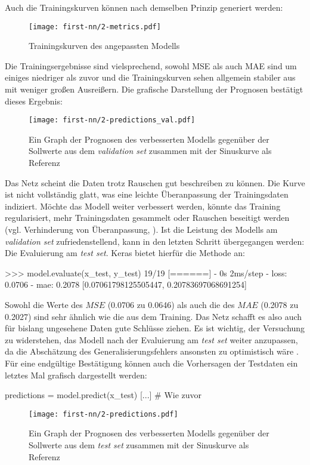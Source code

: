Auch die Trainingskurven können nach demselben Prinzip
generiert werden:
\begin{figure}[h!]
  \centering
  \texttt{[image: first-nn/2-metrics.pdf]}
  \caption{Trainingskurven des angepassten Modells}
\end{figure}

\noindent
Die Trainingsergebnisse sind vielsprechend, sowohl MSE als auch MAE
sind um einiges niedriger als zuvor und die Trainingskurven
sehen allgemein stabiler aus mit weniger großen Ausreißern.
Die grafische Darstellung der Prognosen bestätigt dieses Ergebnis:
\begin{figure}[h!]
  \centering
  \texttt{[image: first-nn/2-predictions\_val.pdf]}
  \caption{Ein Graph der Prognosen des verbesserten Modells gegenüber der Sollwerte aus dem
  \textit{validation set} zusammen mit der Sinuskurve als Referenz}
\end{figure}

\noindent
Das Netz scheint die Daten trotz Rauschen gut beschreiben zu können.
Die Kurve ist nicht vollständig glatt, was eine leichte Überanpassung der Trainingsdaten
indiziert. Möchte das Modell weiter verbessert werden,
könnte das Training regularisiert,
mehr Trainingsdaten gesammelt oder Rauschen beseitigt werden
(vgl. Verhinderung von Überanpassung, \cite[28]{book:hands-on-ml}).
Ist die Leistung des Modells am \textit{validation set} zufriedenstellend,
kann in den letzten Schritt übergegangen werden: Die Evaluierung am \textit{test set}.
Keras bietet hierfür die Methode  an:
\begin{pyconcode}
>>> model.evaluate(x_test, y_test)
19/19 [======] - 0s 2ms/step - loss: 0.0706 - mae: 0.2078
[0.07061798125505447, 0.20783697068691254]
\end{pyconcode}
Sowohl die Werte des $MSE$ (\num{0.0706} zu \num{0.0646}) als auch
die des $MAE$ (\num{0.2078} zu \num{0.2027}) sind sehr ähnlich
wie die aus dem Training. Das Netz schafft es also auch für
bislang ungesehene Daten gute Schlüsse ziehen.
Es ist wichtig, der Versuchung zu widerstehen, das Modell nach
der Evaluierung am \textit{test set} weiter anzupassen, da die Abschätzung
des Generalisierungsfehlers ansonsten zu optimistisch wäre
\parencite[80]{book:hands-on-ml}.
Für eine endgültige Bestätigung können auch die Vorhersagen
der Testdaten ein letztes Mal grafisch dargestellt werden:
\begin{pythoncode}
predictions = model.predict(x_test)
[...] # Wie zuvor
\end{pythoncode}
\begin{figure}[h!]
  \centering
  \texttt{[image: first-nn/2-predictions.pdf]}
  \caption{Ein Graph der Prognosen des verbesserten Modells gegenüber der Sollwerte aus dem
  \textit{test set} zusammen mit der Sinuskurve als Referenz}
\end{figure}

